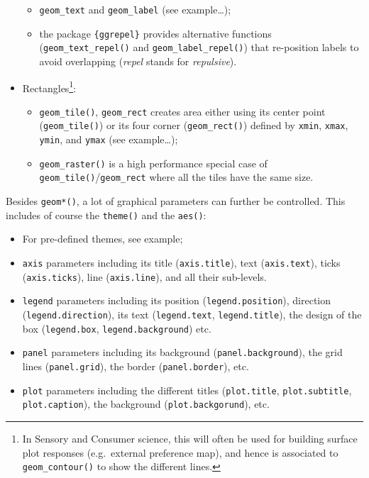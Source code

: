\documentclass[
]{book}
\providecommand{\tightlist}{%
  \setlength{\itemsep}{0pt}\setlength{\parskip}{0pt}}
\begin{document}
\begin{itemize}
  \begin{itemize}
  \tightlist
  \item
    \texttt{geom\_text} and \texttt{geom\_label} (see example\ldots);
  \item
    the package \texttt{\{ggrepel\}} provides alternative functions (\texttt{geom\_text\_repel()} and \texttt{geom\_label\_repel()}) that re-position labels to avoid overlapping (\emph{repel} stands for \emph{repulsive}).
  \end{itemize}
\item
  Rectangles\footnote{In Sensory and Consumer science, this will often be used for building surface plot responses (e.g.~external preference map), and hence is associated to \texttt{geom\_contour()} to show the different lines.}:

  \begin{itemize}
  \tightlist
  \item
    \texttt{geom\_tile()}, \texttt{geom\_rect} creates area either using its center point (\texttt{geom\_tile()}) or its four corner (\texttt{geom\_rect()}) defined by \texttt{xmin}, \texttt{xmax}, \texttt{ymin}, and \texttt{ymax} (see example\ldots);
  \item
    \texttt{geom\_raster()} is a high performance special case of \texttt{geom\_tile()}/\texttt{geom\_rect} where all the tiles have the same size.
  \end{itemize}
\end{itemize}

Besides \texttt{geom*()}, a lot of graphical parameters can further be controlled. This includes of course the \texttt{theme()} and the \texttt{aes()}:

\begin{itemize}
\tightlist
\item
  For pre-defined themes, see example;
\item
  \texttt{axis} parameters including its title (\texttt{axis.title}), text (\texttt{axis.text}), ticks (\texttt{axis.ticks}), line (\texttt{axis.line}), and all their sub-levels.
\item
  \texttt{legend} parameters including its position (\texttt{legend.position}), direction (\texttt{legend.direction}), its text (\texttt{legend.text}, \texttt{legend.title}), the design of the box (\texttt{legend.box}, \texttt{legend.background}) etc.
\item
  \texttt{panel} parameters including its background (\texttt{panel.background}), the grid lines (\texttt{panel.grid}), the border (\texttt{panel.border}), etc.
\item
  \texttt{plot} parameters including the different titles (\texttt{plot.title}, \texttt{plot.subtitle}, \texttt{plot.caption}), the background (\texttt{plot.backgorund}), etc.
\end{itemize}
\end{document}
